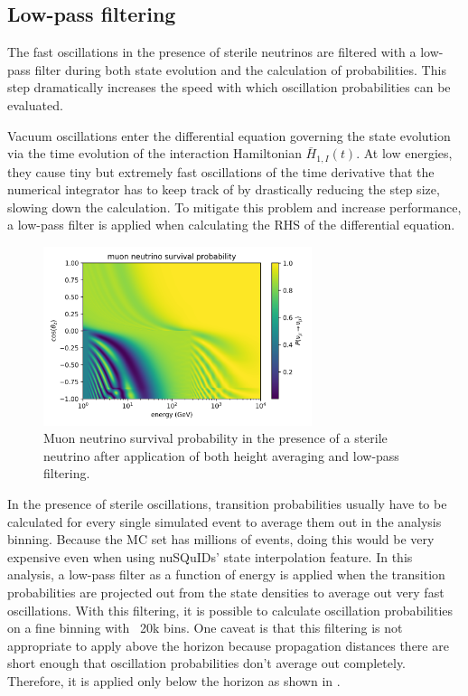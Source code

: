 \subsection{Low-pass filtering}
\label{sec:low-pass-filtering}
The fast oscillations in the presence of sterile neutrinos are filtered with a low-pass filter during both state evolution and the calculation of probabilities.
This step dramatically increases the speed with which oscillation probabilities can be evaluated.

Vacuum oscillations enter the differential equation governing the state evolution via the time evolution of the interaction Hamiltonian $\bar{H}_{1, I}(t)$.
At low energies, they cause tiny but extremely fast oscillations of the time derivative that the numerical integrator has to keep track of by drastically reducing the step size, slowing down the calculation.
To mitigate this problem and increase performance, a low-pass filter is applied when calculating the RHS of the differential equation.

\begin{figure}
    \centering
    \includegraphics[width=0.7\textwidth]{figures/measurement/sterile_analysis/nusquids/Dm41_0.5eV2_th24_15deg_avg_height_10-30km_lp_belowhor.png}
    \caption{Muon neutrino survival probability in the presence of a sterile neutrino after application of both height averaging and low-pass filtering.}
    \label{fig:nusquids-low-pass-filtering}
\end{figure}

In the presence of sterile oscillations, transition probabilities usually have to be calculated for every single simulated event to average them out in the analysis binning.
Because the MC set has millions of events, doing this would be very expensive even when using nuSQuIDs' state interpolation feature.
In this analysis, a low-pass filter as a function of energy is applied when the transition probabilities are projected out from the state densities to average out very fast oscillations.
With this filtering, it is possible to calculate oscillation probabilities on a fine binning with ~20k bins.
One caveat is that this filtering is not appropriate to apply above the horizon because propagation distances there are short enough that oscillation probabilities don't average out completely.
Therefore, it is applied only below the horizon as shown in .

